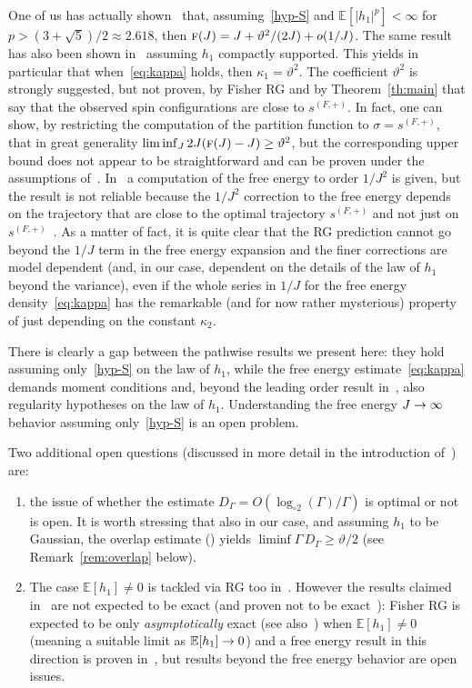 \documentclass[10pt]{amsart}
\theoremstyle{definition}\newtheorem{defi}[theo]{Definition}\newtheorem{rema}[theo]{Remark}\newtheorem{exam}[theo]{Example}\newtheorem{exem}[theo]{Example}\newtheorem{nota}[theo]{Notation}
\newcommand{\bbE}{\mathbb{E}}
\newcommand{\gG}{\Gamma}
\newcommand{\gs}{\sigma}
\newcommand{\tf}{\textsc{f}}
\newcommand{\loglog}{\log_{\circ 2}}
\renewcommand*{\to}{\mathchoice{\longrightarrow}{\rightarrow}{\rightarrow}{\rightarrow}}
\begin{document}
One of us has actually shown~\cite{cf:Orphee} that, assuming~\eqref{hyp-S} and $\bbE[| h_1|^p] <\infty$ for $p>(3 + \sqrt{5})/2\approx 2.618$, then $\tf (J) = J+{\vartheta^2}/{(2J) }+ o(1/J)$. The same result has also been shown in~\cite{cf:DMSDS-B} assuming $h_1$ compactly supported. This yields in particular that when~\eqref{eq:kappa} holds, then $\kappa_1=\vartheta^2$. The coefficient $\vartheta^2$ is strongly suggested, but not proven, by Fisher RG and by Theorem~\ref{th:main} that say that the observed spin configurations are close to $s^{(F, +)}$. In fact, one can show, by restricting the computation of the partition function to $\gs=s^{(F, +)}$, that in great generality $\liminf_{J} 2J (\tf (J)-J)\ge \vartheta^2$, but the corresponding upper bound does not appear to be straightforward and can be proven under the assumptions of~\cite{cf:Orphee}. In~\cite{cf:FLDM01} a computation of the free energy to order $1/J^2$ is given, but the result is not reliable because the $1/J^2$ correction to the free energy depends on the trajectory that are close to the optimal trajectory $s^{(F, +)}$ and not just on $s^{(F, +)}$~\cite{cf:GG22}. As a matter of fact, it is quite clear that the RG prediction cannot go beyond the $1/J$ term in the free energy expansion and the finer corrections are model dependent (and, in our case, dependent on the details of the law of $h_1$ beyond the variance), even if the whole series in $1/J$ for the free energy density~\eqref{eq:kappa} has the remarkable (and for now rather mysterious) property of just depending on the constant $\kappa_2$.


There is clearly a gap between the pathwise results we present here: they hold assuming only~\eqref{hyp-S} on the law of $h_1$, while the free energy estimate~\eqref{eq:kappa} demands moment conditions and, beyond the leading order result in~\cite{cf:Orphee}, also regularity hypotheses on the law of $h_1$. Understanding the free energy $J \to \infty$ behavior assuming only~\eqref{hyp-S} is an open problem.

\pagebreak
Two additional open questions (discussed in more detail in the introduction of~\cite{cf:CGH1}) are:
\begin{enumerate}
\item the issue of whether the estimate $D_\gG=O(\loglog (\gG) / \gG)$ is optimal or not is open. It is worth stressing that also in our case, and assuming $h_1$ to be Gaussian, the overlap estimate (\cite[Remark~2.7]{cf:CGH1}) yields $\liminf \gG \, {D_\gG\ge \vartheta/2}$ (see Remark~\ref{rem:overlap} below).

\item The case $\bbE[h_1]\neq 0$ is tackled via RG too in~\cite{cf:FLDM01}. However the results claimed in~\cite{cf:FLDM01} are not expected to be exact (and proven not to be exact~\cite{cf:GGG17,cf:DH83}): Fisher RG is expected to be only \emph{asymptotically} exact (see also~\cite{cf:IM,cf:Vojta}) when $\bbE[h_1]\neq 0$ (meaning a suitable limit as $\bbE[h_1]\to 0$) and a free energy result in this direction is proven in~\cite{cf:GGG17}, but results beyond the free energy behavior are open issues.
\end{enumerate}
\end{document}
